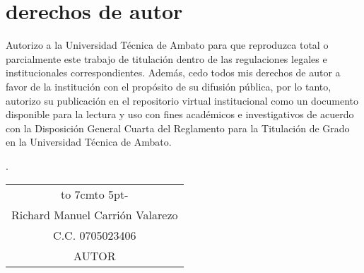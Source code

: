 \chapter*{derechos de autor}
Autorizo a la Universidad Técnica de Ambato para que reproduzca total o parcialmente
este trabajo de titulación dentro de las regulaciones legales e institucionales
correspondientes. Además, cedo todos mis derechos de autor a favor de la institución
con el propósito de su difusión pública, por lo tanto, autorizo su publicación en el
repositorio virtual institucional como un documento disponible para la lectura y uso
con fines académicos e investigativos de acuerdo con la Disposición General Cuarta
del Reglamento para la Titulación de Grado en la Universidad Técnica de Ambato.
\begin{flushright}
	\lugarFechaPrelims.
\end{flushright}

\vspace*{5cm}
\begin{center}
	\begin{tabular}{c}
		\hbox to 7cm{\leaders\hbox to 5pt{\hss - \hss}\hfil} \\
		Richard Manuel Carrión Valarezo                      \\
		C.C. 0705023406                                      \\
		AUTOR
	\end{tabular}
\end{center}

